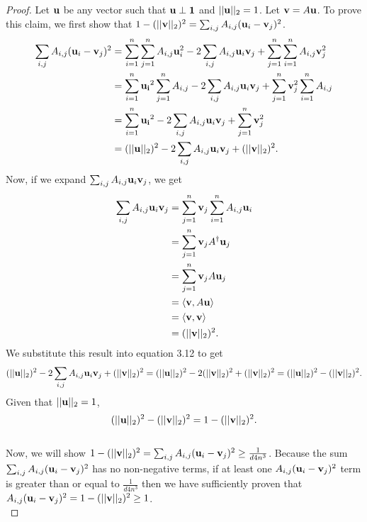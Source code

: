 \documentclass[psamsfonts, 10pt]{amsart}
\theoremstyle{definition}
\theoremstyle{remark}
\numberwithin{equation}{section}
\newcommand{\creturn}{\mbox{}\\}
\begin{document}
\begin{proof}
Let ${\bf u}$ be any vector such that ${\bf u \perp {\bf 1}}$ and $\lvert \lvert {\bf u} \rvert \rvert_2 = 1$. Let ${\bf v} = A{\bf u}$. To prove this claim, we first show that $1 - (\lvert \lvert {\bf v} \rvert \rvert_2)^2 = \sum_{i,j}A_{i,j}({\bf u}_i - {\bf v}_j)^2$.\\
\begin{equation}
\begin{aligned}
\sum_{i,j}A_{i,j}({\bf u}_i - {\bf v}_j)^2 &= \sum_{i=1}^{n}\sum_{j=1}^{n}A_{i,j}{\bf u}_i^2 - 2\sum_{i,j}A_{i,j}{\bf u}_i{\bf v}_j + \sum_{j=1}^{n}\sum_{i=1}^{n}A_{i,j}{\bf v}_j^2\\
&= \sum_{i=1}^{n}{\bf u_i}^2\sum_{j=1}^{n}A_{i,j} - 2\sum_{i,j}A_{i,j}{\bf u}_i{\bf v}_j + \sum_{j=1}^{n}{\bf v}_j^2\sum_{i=1}^{n}A_{i,j}\\
&= \sum_{i=1}^{n}{\bf u_i}^2 - 2\sum_{i,j}A_{i,j}{\bf u}_i{\bf v}_j + \sum_{j=1}^{n}{\bf v}_j^2\\
&= (\lvert \lvert {\bf u} \rvert \rvert_2)^2 -  2\sum_{i,j}A_{i,j}{\bf u}_i{\bf v}_j + (\lvert \lvert {\bf v} \rvert \rvert_2)^2.
\end{aligned}
\end{equation}
Now, if we expand $\sum_{i,j}A_{i,j}{\bf u}_i{\bf v}_j$, we get
\[
\begin{aligned}
\sum_{i,j}A_{i,j}{\bf u}_i{\bf v}_j &= \sum_{j=1}^n{\bf v}_j\sum_{i=1}^n A_{i,j}{\bf u}_i\\
&= \sum_{j=1}^n{\bf v}_jA^{\dagger}{\bf u}_j\\
&= \sum_{j=1}^n{\bf v}_jA{\bf u}_j\\
&= \langle {\bf v} , A{\bf u} \rangle\\
&= \langle {\bf v}, {\bf v} \rangle\\
&= (\lvert \lvert {\bf v} \rvert \rvert_2)^2.
\end{aligned}
\]
We substitute this result into equation 3.12 to get
\[
(\lvert \lvert {\bf u} \rvert \rvert_2)^2 -  2\sum_{i,j}A_{i,j}{\bf u}_i{\bf v}_j + (\lvert \lvert {\bf v} \rvert \rvert_2)^2 = (\lvert \lvert {\bf u} \rvert \rvert_2)^2 - 2(\lvert \lvert {\bf v} \rvert \rvert_2)^2 + (\lvert \lvert {\bf v} \rvert \rvert_2)^2 =  (\lvert \lvert {\bf u} \rvert \rvert_2)^2 - (\lvert \lvert {\bf v} \rvert \rvert_2)^2.
\]
Given that $\lvert \lvert {\bf u} \rvert \rvert_2 = 1$,
\[
 (\lvert \lvert {\bf u} \rvert \rvert_2)^2 - (\lvert \lvert {\bf v} \rvert \rvert_2)^2 =  1 - (\lvert \lvert {\bf v} \rvert \rvert_2)^2.
\]\creturn
Now, we will show $1 - (\lvert \lvert {\bf v} \rvert \rvert_2)^2 = \sum_{i,j}A_{i,j}({\bf u}_i - {\bf v}_j)^2 \geq \frac{1}{d4n^3}$. Because the sum $\sum_{i,j}A_{i,j}({\bf u}_i - {\bf v}_j)^2$ has no non-negative terms, if at least one $A_{i,j}({\bf u}_i - {\bf v}_j)^2$ term is greater than or equal to $\frac{1}{d4n^3}$ then we have sufficiently proven that $A_{i,j}({\bf u}_i - {\bf v}_j)^2 = 1 - (\lvert \lvert {\bf v} \rvert \rvert_2)^2 \geq 1$.\\


\end{proof}
\end{document}

